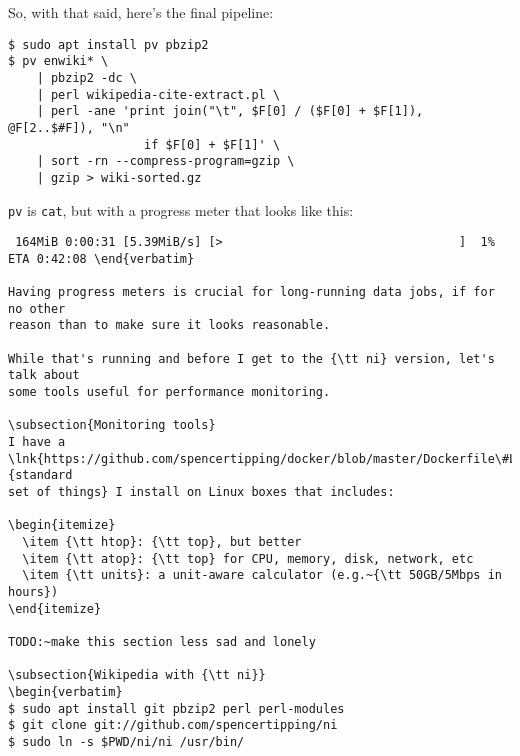 So, with that said, here's the final pipeline:

\begin{verbatim}
$ sudo apt install pv pbzip2
$ pv enwiki* \
    | pbzip2 -dc \
    | perl wikipedia-cite-extract.pl \
    | perl -ane 'print join("\t", $F[0] / ($F[0] + $F[1]), @F[2..$#F]), "\n"
                   if $F[0] + $F[1]' \
    | sort -rn --compress-program=gzip \
    | gzip > wiki-sorted.gz\end{verbatim}

{\tt pv} is {\tt cat}, but with a progress meter that looks like this:

\begin{verbatim}
 164MiB 0:00:31 [5.39MiB/s] [>                                 ]  1% ETA 0:42:08 \end{verbatim}

Having progress meters is crucial for long-running data jobs, if for no other
reason than to make sure it looks reasonable.

While that's running and before I get to the {\tt ni} version, let's talk about
some tools useful for performance monitoring.

\subsection{Monitoring tools}
I have a
\lnk{https://github.com/spencertipping/docker/blob/master/Dockerfile\#L20}{standard
set of things} I install on Linux boxes that includes:

\begin{itemize}
  \item {\tt htop}: {\tt top}, but better
  \item {\tt atop}: {\tt top} for CPU, memory, disk, network, etc
  \item {\tt units}: a unit-aware calculator (e.g.~{\tt 50GB/5Mbps in hours})
\end{itemize}

TODO:~make this section less sad and lonely

\subsection{Wikipedia with {\tt ni}}
\begin{verbatim}
$ sudo apt install git pbzip2 perl perl-modules
$ git clone git://github.com/spencertipping/ni
$ sudo ln -s $PWD/ni/ni /usr/bin/\end{verbatim}

